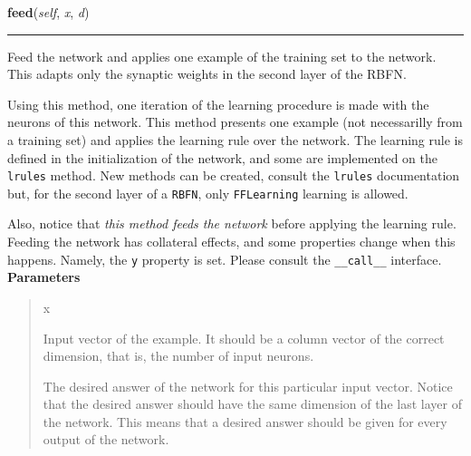     \label{peach:nn:rbfn:RBFN:feed}

    \vspace{0.5ex}

\hspace{.8\funcindent}\begin{boxedminipage}{\funcwidth}

    \raggedright \textbf{feed}(\textit{self}, \textit{x}, \textit{d})

    \vspace{-1.5ex}

    \rule{\textwidth}{0.5\fboxrule}
\setlength{\parskip}{2ex}

Feed the network and applies one example of the training set to the
network. This adapts only the synaptic weights in the second layer of
the RBFN.

Using this method, one iteration of the learning procedure is made with
the neurons of this network. This method presents one example (not
necessarilly from a training set) and applies the learning rule over the
network. The learning rule is defined in the initialization of the
network, and some are implemented on the \texttt{lrules} method. New methods
can be created, consult the \texttt{lrules} documentation but, for the second
layer of a \texttt{RBFN}, only \texttt{FFLearning} learning is allowed.

Also, notice that \emph{this method feeds the network} before applying the
learning rule. Feeding the network has collateral effects, and some
properties change when this happens. Namely, the \texttt{y} property is set.
Please consult the \texttt{\_\_call\_\_} interface.
\setlength{\parskip}{1ex}
      \textbf{Parameters}
      \vspace{-1ex}

      \begin{quote}
        \begin{Ventry}{x}

          \item[x]


Input vector of the example. It should be a column vector of the
correct dimension, that is, the number of input neurons.
          \item[d]


The desired answer of the network for this particular input vector.
Notice that the desired answer should have the same dimension of the
last layer of the network. This means that a desired answer should
be given for every output of the network.
        \end{Ventry}


\end{quote}
\end{boxedminipage}
